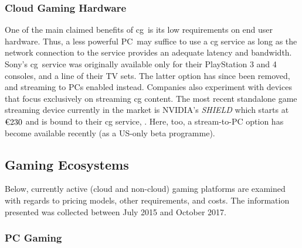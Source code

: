 \subsubsection{Cloud Gaming Hardware}
One of the main claimed benefits of \gls{cg} is its low requirements
on end user hardware. Thus, a less powerful \gls{PC} may suffice to
use a \gls{cg} service as long as the network connection to the
service provides an adequate latency and bandwidth.
Sony's \psnow \gls{cg} service was originally available only for their
PlayStation 3 and 4 consoles, and a line of their TV sets. The latter
option has since been removed, and streaming to \glspl{PC} enabled
instead.
Companies also experiment with devices that focus exclusively on streaming
\gls{cg} content. The most recent standalone game streaming device currently
in the market is NVIDIA's \textit{SHIELD} which starts at
$\text{\texteuro} 230$ and is bound to their \gls{cg} service, \gfnow.
Here, too, a stream-to-\gls{PC} option has become available recently
(as a US-only beta programme).



\subsection{Gaming Ecosystems}
Below, currently active (cloud and non-cloud) gaming platforms are examined
with regards to pricing models, other requirements, and costs. The
information presented was collected between July 2015 and October 2017.

\subsubsection{\gls{PC} Gaming}
\label{sec:pcgaming}

